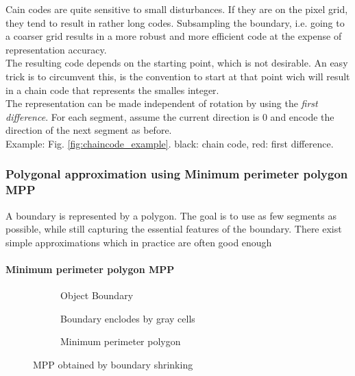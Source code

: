 Cain codes are quite sensitive to small disturbances. If they are on the pixel grid, they tend to result in rather long codes. Subsampling the boundary, i.e. going to a coarser grid results in a more robust and more efficient code at the expense of representation accuracy.\\
The resulting code depends on the starting point, which is not desirable. An easy trick is to circumvent this, is the convention to start at that point wich will result in a chain code that represents the smalles integer.\\

The representation can be made independent of rotation by using the \emph{first difference}. 
For each segment, assume the current direction is 0 and encode the direction of the next segment as before. \\
Example: Fig. \ref{fig:chaincode_example}. black: chain code, red: first difference.

\subsubsection{Polygonal approximation using Minimum perimeter polygon MPP}
A boundary is represented by a polygon. The goal is to use as few segments as possible, while still capturing the essential features of the boundary. There exist simple approximations which in practice are often good enough\\
\paragraph{Minimum perimeter polygon MPP}
\begin{figure}[h]
	\centering
	\begin{subfigure}[b]{0.3\textwidth}
		\centering
		\caption{Object Boundary}
	\end{subfigure}
	\begin{subfigure}[b]{0.3\textwidth}
		\centering
		\caption{Boundary enclodes by gray cells}
	\end{subfigure}
	\begin{subfigure}[b]{0.3\textwidth}
		\centering
		\caption{Minimum perimeter polygon}
	\end{subfigure}
	\caption{MPP obtained by boundary shrinking}
\end{figure}

